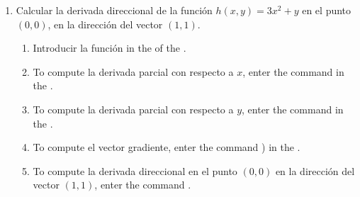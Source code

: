 \begin{enumerate}[leftmargin=*]

\item Calcular la derivada direccional de la función $h(x,y)= 3x^2+y$ en el punto $(0,0)$, en la dirección del vector $(1,1)$.
      \begin{indication}
      \begin{enumerate}
      \item Introducir la función  in the  of the .
      \item To compute la derivada parcial con respecto a $x$, enter the command  in the .
      \item To compute la derivada parcial con respecto a $y$, enter the command  in the .
      \item To compute el vector gradiente, enter the command ) in the .
      \item To compute la derivada direccional en el punto $(0,0)$ en la dirección del vector $(1,1)$, enter the command .
      \end{enumerate}
      \end{indication}


\end{enumerate}
